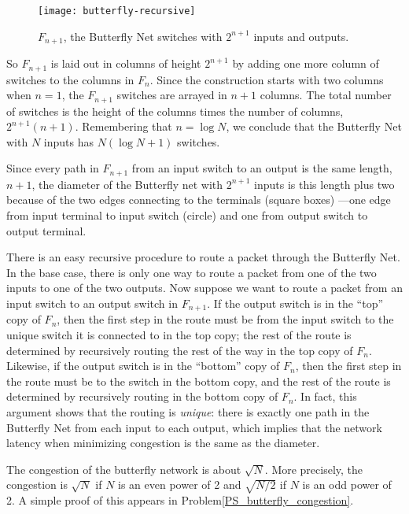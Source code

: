 \begin{figure}
\texttt{[image: butterfly-recursive]}
\caption{$F_{n+1}$, the Butterfly Net switches with $2^{n+1}$ inputs
and outputs.}
\label{fig:butterfly-recursive}
\end{figure}

So $F_{n+1}$ is laid out in columns of height $2^{n+1}$ by adding one more
column of switches to the columns in $F_n$.  Since the construction starts
with two columns when $n=1$, the $F_{n+1}$ switches are arrayed in $n+1$
columns.  The total number of switches is the height of the columns times
the number of columns, $2^{n+1}(n+1)$.  Remembering that $n=\log
N$, we conclude that the Butterfly Net with $N$ inputs has $N(\log N +1)$
switches.

Since every path in $F_{n+1}$ from an input switch to an output is the
same length, $n+1$, the diameter of the Butterfly net with
$2^{n+1}$ inputs is this length plus two because of the two edges
connecting to the terminals (square boxes) ---one edge from input
terminal to input switch (circle) and one from output switch to output
terminal.

There is an easy recursive procedure to route a packet through the
Butterfly Net.  In the base case, there is only one way to route
a packet from one of the two inputs to one of the two outputs.  Now
suppose we want to route a packet from an input switch to an output switch
in $F_{n+1}$.  If the output switch is in the ``top'' copy of $F_n$, then
the first step in the route must be from the input switch to the unique
switch it is connected to in the top copy; the rest of the route is
determined by recursively routing the rest of the way in the top copy of
$F_n$.  Likewise, if the output switch is in the ``bottom'' copy of $F_n$,
then the first step in the route must be to the switch in the bottom copy,
and the rest of the route is determined by recursively routing in the
bottom copy of $F_n$.  In fact, this argument shows that the routing is
\emph{unique}: there is exactly one path in the Butterfly Net from each
input to each output, which implies that the network latency when
minimizing congestion is the same as the diameter.

The congestion of the butterfly network is about $\sqrt{N}$.  More
precisely, the congestion is $\sqrt{N}$ if $N$ is an even power of 2 and
$\sqrt{N/2}$ if $N$ is an odd power of 2.  A simple proof of this appears
in Problem\ref{PS_butterfly_congestion}.

